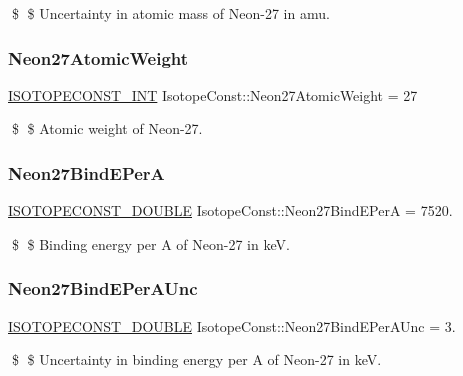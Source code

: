 \$ \$ Uncertainty in atomic mass of Neon-\/27 in amu. \mbox{\label{group___isotope_const-_neon-_ne27_gae1858338934f334313059c6c53c8766c}} 
\subsubsection{\texorpdfstring{Neon27\+Atomic\+Weight}{Neon27AtomicWeight}}
{\footnotesize\ttfamily \mbox{\hyperlink{group___isotope_const-_macros_ga5f18360b3e99483a35c32d789e62621c}{I\+S\+O\+T\+O\+P\+E\+C\+O\+N\+S\+T\+\_\+\+I\+NT}} Isotope\+Const\+::\+Neon27\+Atomic\+Weight = 27}

\$ \$ Atomic weight of Neon-\/27. \mbox{\label{group___isotope_const-_neon-_ne27_ga7fee8e4afd3b6a9e15c75a193f1a6bcf}} 
\subsubsection{\texorpdfstring{Neon27\+Bind\+E\+PerA}{Neon27BindEPerA}}
{\footnotesize\ttfamily \mbox{\hyperlink{group___isotope_const-_macros_ga8f45a7272ce02c0b4c65c44636ed719a}{I\+S\+O\+T\+O\+P\+E\+C\+O\+N\+S\+T\+\_\+\+D\+O\+U\+B\+LE}} Isotope\+Const\+::\+Neon27\+Bind\+E\+PerA = 7520.}

\$ \$ Binding energy per A of Neon-\/27 in keV. \mbox{\label{group___isotope_const-_neon-_ne27_gaed104beec13c846cbe9da379534fe886}} 
\subsubsection{\texorpdfstring{Neon27\+Bind\+E\+Per\+A\+Unc}{Neon27BindEPerAUnc}}
{\footnotesize\ttfamily \mbox{\hyperlink{group___isotope_const-_macros_ga8f45a7272ce02c0b4c65c44636ed719a}{I\+S\+O\+T\+O\+P\+E\+C\+O\+N\+S\+T\+\_\+\+D\+O\+U\+B\+LE}} Isotope\+Const\+::\+Neon27\+Bind\+E\+Per\+A\+Unc = 3.}

\$ \$ Uncertainty in binding energy per A of Neon-\/27 in keV. \mbox{\label{group___isotope_const-_neon-_ne27_ga808d5bc9fadb74f54530b4c3055a7ee2}} 
